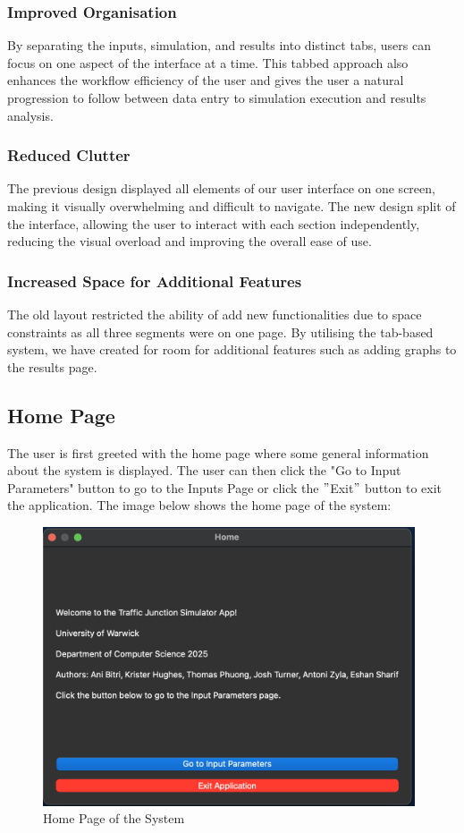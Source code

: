 \documentclass{article}
\begin{document}
    \subsubsection{Improved Organisation}
    By separating the inputs, simulation, and results into distinct tabs, users can focus on one aspect of the interface at a time. This tabbed approach also enhances
    the workflow efficiency of the user and gives the user a natural progression to follow between data entry to simulation execution and results analysis.

    \subsubsection{Reduced Clutter}
    The previous design displayed all elements of our user interface on one screen, making it visually overwhelming and difficult to navigate. The new design split of
    the interface, allowing the user to interact with each section independently, reducing the visual overload and improving the overall ease of use.

    \subsubsection{Increased Space for Additional Features}
    The old layout restricted the ability of add new functionalities due to space constraints as all three segments were on one page. By utilising the tab-based system,
    we have created for room for additional features such as adding graphs to the results page.

    \subsection{Home Page}

    The user is first greeted with the home page where some general information about the system is displayed. The user can then click the "Go to Input Parameters" button to go to the Inputs Page
    or click the \("\)Exit\("\) button to exit the application.
    The image below shows the home page of the system:

    \begin{figure}[H]
        \centering
        \includegraphics[width=11cm]{homepage}
        \caption{Home Page of the System}
        \label{fig:homepage}
    \end{figure}
\end{document}
